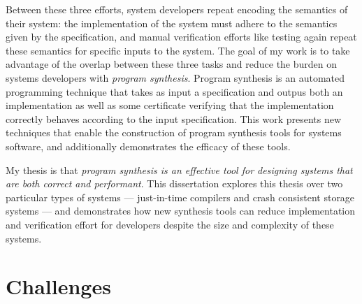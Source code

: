 Between these three efforts, system developers repeat encoding the semantics of
their system: the implementation of the system must adhere to the semantics
given by the specification, and manual verification efforts like testing again
repeat these semantics for specific inputs to the system.
The goal of my work is to take advantage of the overlap between these three tasks
and reduce the burden on systems developers with \textit{program synthesis}.
Program synthesis is an automated programming technique
that takes as input a specification and outpus both an implementation
as well as some certificate verifying that the implementation correctly behaves
according to the input specification.
This work presents new techniques that enable the construction of program
synthesis tools for systems software, and additionally demonstrates the
efficacy of these tools.



My thesis is that \textit{program
synthesis is an effective tool for designing systems that are both correct and
performant}.  This dissertation explores this thesis over two particular types
of systems --- just-in-time compilers and crash consistent storage systems ---
and demonstrates how new synthesis tools can reduce implementation and verification
effort for developers despite the size and complexity of these systems.


\section{Challenges}

